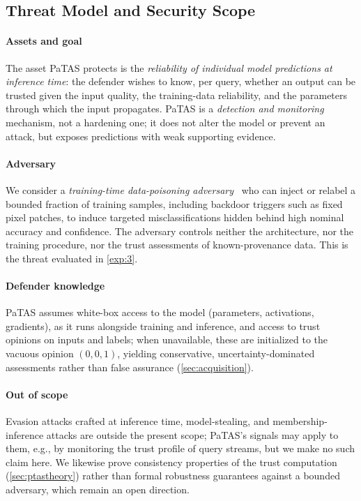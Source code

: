 \vspace{-0.5em}
\subsection{Threat Model and Security Scope}\label{sec:threat}
\vspace{-0.5em}

\paragraph*{Assets and goal}
The asset PaTAS protects is the \emph{reliability of individual model predictions at inference time}: the defender wishes to know, per query, whether an output can be trusted given the input quality, the training-data reliability, and the parameters through which the input propagates. PaTAS is a \emph{detection and monitoring} mechanism, not a hardening one; it does not alter the model or prevent an attack, but exposes predictions with weak supporting evidence.

\paragraph*{Adversary}
We consider a \emph{training-time data-poisoning adversary}~\cite{chen2017targetedbackdoorattacksdeep} who can inject or relabel a bounded fraction of training samples, including backdoor triggers such as fixed pixel patches, to induce targeted misclassifications hidden behind high nominal accuracy and confidence. The adversary controls neither the architecture, nor the training procedure, nor the trust assessments of known-provenance data. This is the threat evaluated in \cref{exp:3}.

\paragraph*{Defender knowledge}
PaTAS assumes white-box access to the model (parameters, activations, gradients), as it runs alongside training and inference, and access to trust opinions on inputs and labels; when unavailable, these are initialized to the vacuous opinion \((0,0,1)\), yielding conservative, uncertainty-dominated assessments rather than false assurance (\cref{sec:acquisition}).

\paragraph*{Out of scope}
Evasion attacks crafted at inference time, model-stealing, and membership-inference attacks are outside the present scope; PaTAS's signals may apply to them, e.g., by monitoring the trust profile of query streams, but we make no such claim here. We likewise prove consistency properties of the trust computation (\cref{sec:ptastheory}) rather than formal robustness guarantees against a bounded adversary, which remain an open direction.
